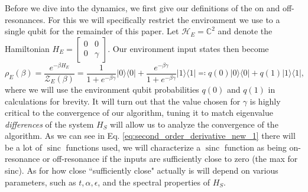 \documentclass[
 amsmath,amssymb,
 aps,
onecolumn, 
nofootinbib]{revtex4-2}
\newcommand{\ketbra}[2]{| #1\rangle\! \langle #2|}
\newcommand{\hilb}{\mathcal{H}}
\newcommand{\partfun}{\mathcal{Z}}
\DeclareMathOperator{\sinc}{sinc}
\begin{document}
Before we dive into the dynamics, we first give our definitions of the on and off-resonances. For this we will specifically restrict the environment we use to a single qubit for the remainder of this paper. Let $\hilb_E = \mathbb{C}^2$ and denote the Hamiltonian $H_E = \begin{bmatrix} 0 & 0 \\ 0 & \gamma \end{bmatrix}$. Our environment input states then become
\begin{equation}
    \rho_E(\beta) = \frac{e^{-\beta H_E}}{\partfun_E(\beta)} = \frac{1}{1 + e^{-\beta \gamma}} \ketbra{0}{0} + \frac{e^{-\beta \gamma}}{1 + e^{-\beta \gamma}} \ketbra{1}{1} \eqqcolon q(0) \ketbra{0}{0} + q(1) \ketbra{1}{1} \label{eq:env_state_def},
\end{equation}
where we will use the environment qubit probabilities $q(0)$ and $q(1)$ in calculations for brevity. It will turn out that the value chosen for $\gamma$ is highly critical to the convergence of our algorithm, tuning it to match eigenvalue \emph{differences} of the system $H_S$ will allow us to analyze the convergence of the algorithm. As we can see in Eq. \eqref{eq:second_order_derivative_new_1} there will be a lot of $\sinc$ functions used, we will characterize a $\sinc$ function as being on-resonance or off-resonance if the inputs are sufficiently close to zero (the max for sinc). As for how close ``sufficiently close" actually is will depend on various parameters, such as $t, \alpha, \epsilon$, and the spectral properties of $H_S$.  
\end{document}
